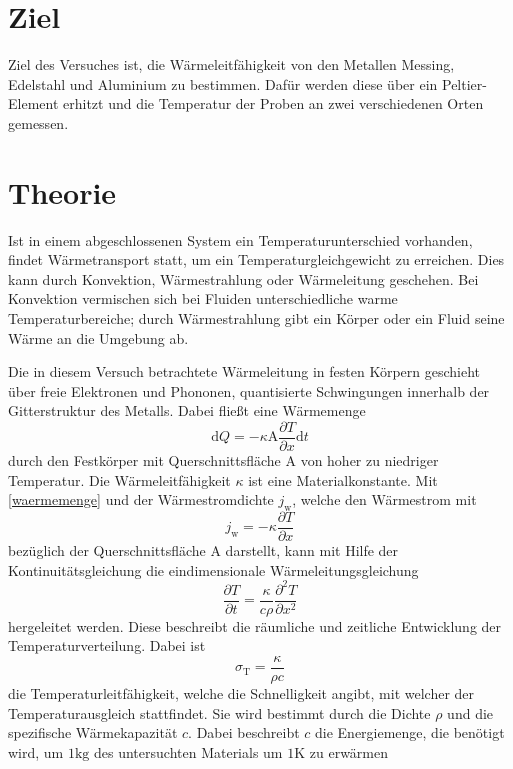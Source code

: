 \section{Ziel}
\label{sec:ziel}

Ziel des Versuches ist, die Wärmeleitfähigkeit von den Metallen Messing, Edelstahl und Aluminium zu bestimmen. Dafür werden diese über ein Peltier-Element erhitzt und die Temperatur der Proben an zwei verschiedenen Orten gemessen.

\section{Theorie}
\label{sec:theorie}

Ist in einem abgeschlossenen System ein Temperaturunterschied vorhanden, findet Wärmetransport statt, um ein Temperaturgleichgewicht zu erreichen. Dies kann durch Konvektion, Wärmestrahlung oder Wärmeleitung geschehen. 
Bei Konvektion vermischen sich bei Fluiden unterschiedliche warme Temperaturbereiche; 
durch Wärmestrahlung gibt ein Körper oder ein Fluid seine Wärme an die Umgebung ab.

Die in diesem Versuch betrachtete Wärmeleitung in festen Körpern geschieht über freie Elektronen und Phononen, quantisierte Schwingungen innerhalb der Gitterstruktur des Metalls.
Dabei fließt eine Wärmemenge
\begin{equation}
	\label{waermemenge}
	\mathup{d}Q=-\kappa\mathup{A}\frac{\partial{T}}{\partial{x}}\mathup{d}t
\end{equation}
durch den Festkörper mit Querschnittsfläche A von hoher zu niedriger Temperatur.
Die Wärmeleitfähigkeit $\kappa$ ist eine Materialkonstante.
Mit \eqref{waermemenge} und der Wärmestromdichte $j_\mathup{w}$, welche den Wärmestrom mit 
\begin{equation}
	\label{waermestromdichte}
	j_\mathup{w}= -\kappa \frac{\partial{T}}{\partial{x}}
\end{equation}
bezüglich der Querschnittsfläche A darstellt,
kann mit Hilfe der Kontinuitätsgleichung die eindimensionale Wärmeleitungsgleichung
\begin{equation}
	\label{waermeleitungsgleichung}
	\frac{\partial{T}}{\partial{t}} =  \frac{\kappa}{c\rho}\frac{\partial^2{T}}{\partial{x^2}}
\end{equation}
hergeleitet werden.
Diese beschreibt die räumliche und zeitliche Entwicklung der Temperaturverteilung. 
Dabei ist
\begin{equation}
	\label{temperaturleitfaehigkeit}
	\sigma_\mathup{T}=\frac{\kappa}{{\rho}c}
\end{equation}
die Temperaturleitfähigkeit, welche die Schnelligkeit angibt, mit welcher der Temperaturausgleich stattfindet.
Sie wird bestimmt durch die Dichte $\rho$ und die spezifische Wärmekapazität $c$. 
Dabei beschreibt $c$ die Energiemenge, die benötigt wird, um $1\si{\kilo\gram}$ des untersuchten Materials um $1\si{\kelvin}$ zu erwärmen

